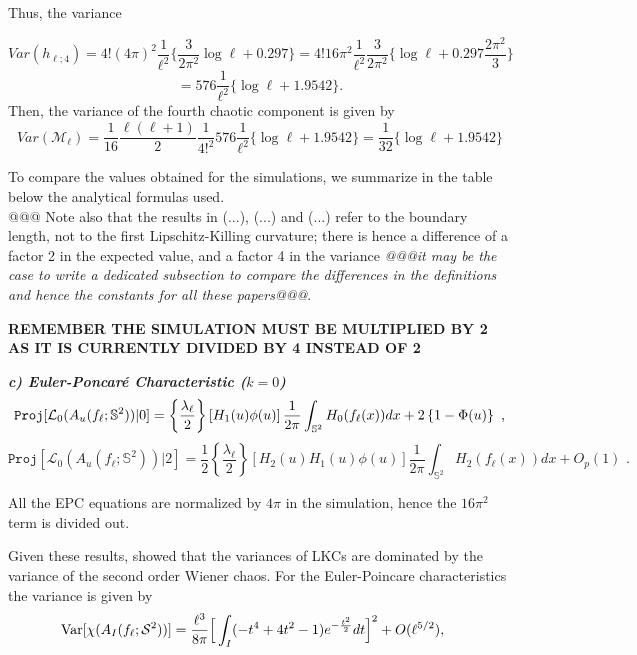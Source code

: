 \documentclass[aps,prd,showpacs,superscriptaddress,groupedaddress]{revtex4-1}  %
\begin{document}
Thus, the variance 

$$Var(h_{\ell;4})= 4! (4\pi)^2 \dfrac{1}{\ell^2} \bigg\{ \frac{3}{2\pi^2} \log \ell +0.297 \bigg\}= 4!16\pi^2 \dfrac{1}{\ell^2} \dfrac{3}{2\pi^2} \bigg\{ \log \ell+0.297\dfrac{2\pi^2}{3} \bigg\}$$
$$=576 \dfrac{1}{\ell^2} \bigg\{ \log \ell+1.9542 \bigg\}.$$
Then, the variance of the fourth chaotic component is given by
$$Var(\mathcal{M}_{\ell})=\dfrac{1}{16} \dfrac{\ell(\ell+1)}{2} \dfrac{1}{4!^2} 576 \dfrac{1}{\ell^2} \bigg\{ \log \ell+1.9542 \bigg\}= \dfrac{1}{32} \bigg\{ \log \ell+1.9542 \bigg\}$$


To compare the values obtained for the simulations, we summarize in the table below the analytical formulas used.\\
@@@
Note also that the results in (...), (...) and (...) refer to the boundary length, not to the first Lipschitz-Killing curvature; there is hence a difference of a factor 2 in the expected value, and a factor 4 in the variance \emph{@@@it may be the case to write a dedicated subsection to compare the differences in the definitions and hence the constants for all these papers@@@}.


{\bf REMEMBER THE SIMULATION MUST BE MULTIPLIED BY 2 AS IT IS CURRENTLY DIVIDED BY 4 INSTEAD OF 2}

\vspace{0.5cm}

\emph{\bf c) Euler-Poncar\'{e} Characteristic ($k=0$)} %
\begin{equation*}
\mathtt{Proj}[\mathcal{L}_{0}(A_{u}(f_{\ell };\mathbb{S}^{2}))|0]=\left\{ 
\frac{\lambda _{\ell }}{2}\right\} \left[ H_{1}(u)\phi (u)\right] \frac{1}{%
2\pi }\int_{\mathbb{S}^{2}}H_{0}(f_{\ell }(x))dx+2\left\{ 1-\Phi (u)\right\} 
\text{ ,}
\end{equation*}%
\begin{equation*}
\mathtt{Proj}[\mathcal{L}_{0}(A_{u}(f_{\ell };\mathbb{S}^{2}))|2]=\frac{1}{2}%
\left\{ \frac{\lambda _{\ell }}{2}\right\} \left[ H_{2}(u)H_{1}(u)\phi (u)%
\right] \frac{1}{2\pi }\int_{\mathbb{S}^{2}}H_{2}(f_{\ell }(x))dx+O_{p}(1)%
\text{ .}
\end{equation*}%

All the EPC equations are normalized by $4\pi$ in the simulation, hence the $16\pi^2$ term is divided out.

Given these results, \cite{cm1603} showed that the variances of LKCs
are dominated by the variance of the second order Wiener chaos. For
the Euler-Poincare characteristics the variance is given by
\begin{align*}
\text{Var}[\chi (A_{I}(f_{\ell }; {\cal S}^2) )]
&=\frac{\ell^3}{8 \pi } 
\Big[   \int_{I}  (-t^4+4 t^2 -1) e^{-\frac {t^2} 2 } d t \Big]^2+O(\ell^{5/2}),  
\end{align*}
\end{document}
